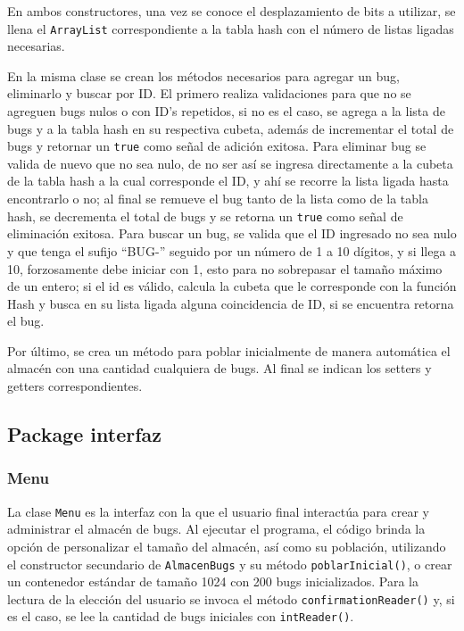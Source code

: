 \documentclass[12pt,letterpaper]{article}
\begin{document}
En ambos constructores, una vez se conoce el desplazamiento de bits a utilizar, se llena el \texttt{ArrayList} correspondiente a la tabla hash con el número de listas ligadas necesarias.

En la misma clase se crean los métodos necesarios para agregar un bug, eliminarlo y buscar por ID. El primero realiza validaciones para que no se agreguen bugs nulos o con ID's repetidos, si no es el caso, se agrega a la lista de bugs y a la tabla hash en su respectiva cubeta, además de incrementar el total de bugs y retornar un \texttt{true} como señal de adición exitosa. Para eliminar bug se valida de nuevo que no sea nulo, de no ser así se ingresa directamente a la cubeta de la tabla hash a la cual corresponde el ID, y ahí se recorre la lista ligada hasta encontrarlo o no; al final se remueve el bug tanto de la lista como de la tabla hash, se decrementa el total de bugs y se retorna un \texttt{true} como señal de eliminación exitosa. Para buscar un bug, se valida que el ID ingresado no sea nulo y que tenga el sufijo ``BUG-'' seguido por un número de 1 a 10 dígitos, y si llega a 10, forzosamente debe iniciar con 1, esto para no sobrepasar el tamaño máximo de un entero; si el id es válido, calcula la cubeta que le corresponde con la función Hash y busca en su lista ligada alguna coincidencia de ID, si se encuentra retorna el bug.

Por último, se crea un método para poblar inicialmente de manera automática el almacén con una cantidad cualquiera de bugs. Al final se indican los setters y getters correspondientes.

\subsection{Package interfaz}

\subsubsection*{Menu}
La clase \texttt{Menu} es la interfaz con la que el usuario final interactúa para crear y administrar el almacén de bugs. Al ejecutar el programa, el código brinda la opción de personalizar el tamaño del almacén, así como su población, utilizando el constructor secundario de \texttt{AlmacenBugs} y su método \texttt{poblarInicial()}, o crear un contenedor estándar de tamaño 1024 con 200 bugs inicializados. Para la lectura de la elección del usuario se invoca el método \texttt{confirmationReader()} y, si es el caso, se lee la cantidad de bugs iniciales con \texttt{intReader()}.
\end{document}
